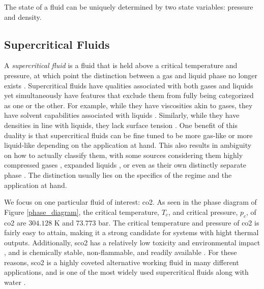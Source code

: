 The state of a fluid can be uniquely determined by two state variables: pressure and density. 


%

\subsection{Supercritical Fluids}

A \textit{supercritical fluid} is a fluid that is held above a critical temperature and pressure, at which point the distinction between a gas and liquid phase no longer exists \cite{SCF2, SCF1}. Supercritical fluids have qualities associated with both gases and liquids yet simultaneously have features that exclude them from fully being categorized as one or the other. For example, while they have viscosities akin to gases, they have solvent capabilities associated with liquids \cite{}. Similarly, while they have densities in line with liquids, they lack surface tension \cite{}. One benefit of this duality is that supercritical fluids can be fine tuned to be more gas-like or more liquid-like depending on the application at hand. This also results in ambiguity on how to actually classify them, with some sources considering them highly compressed gases \cite{Gordon}, expanded liquids \cite{Aggarwal}, or even as their own distinctly separate phase \cite{BANUTI201512}. The distinction usually lies on the specifics of the regime and the application at hand. 

We focus on one particular fluid of interest: \gls{co2}. As seen in the phase diagram of Figure \ref{phase_diagram}, the critical temperature, $T_c$, and critical pressure, $p_c$, of \gls{co2} are $304.128 $ K and $73.773$ bar. The critical temperature and pressure of \gls{co2} is fairly easy to attain, making it a strong candidate for systems with hight thermal outputs. Additionally, \gls{sco2} has a relatively low toxicity and environmental impact \cite{}, and is chemically stable, non-flammable, and readily available \cite{}. For these reasons, \gls{sco2} is a highly coveted alternative working fluid in many different applications, and is one of the most widely used supercritical fluids along with water \cite{SCF2}. 

